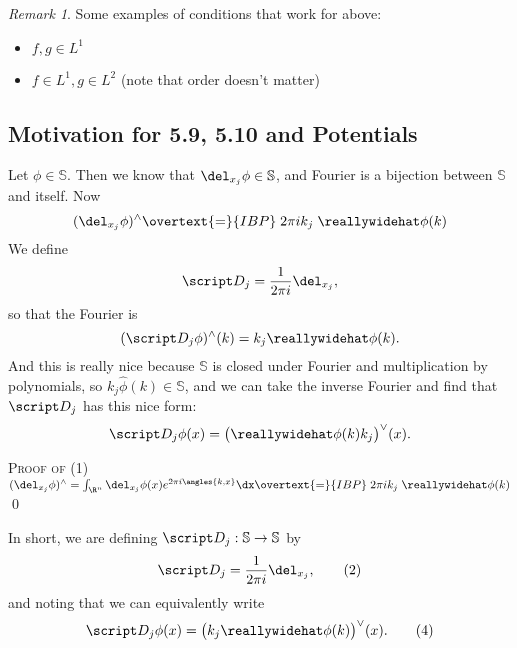 \documentclass[a5paper]{article}
\theoremstyle{definition}%
\numberwithin{exercise}{section}
\theoremstyle{remark}%
\newtheorem*{remark*}{Remark}
\renewcommand{\S}{\mathbb{S}}
\begin{document}
\pagebreak
\begin{remark*}
Some examples of conditions that work for above:
	\begin{itemize}
	\item $f,g\in L^1$
	\item $f\in L^1, g\in L^2$ (note that order doesn't matter)
	\end{itemize}
\end{remark*}


\subsection*{Motivation for 5.9, 5.10 and Potentials}

Let $\phi\in\S$. Then we know that $\del_{x_j}\phi\in\S$, and Fourier is a bijection between $\S$ and itself. Now 
\setcounter{equation}{0}
\begin{equation}
(\del_{x_j}\phi)^\wedge \overtext{=}{IBP} \;2\pi i k_j \;\hat{\phi}(k)
\end{equation}
We define 
\begin{equation}
\D_j = \frac{1}{2\pi i} \del_{x_j},
\end{equation}
so that the Fourier is 
\begin{equation}
(\D_j\phi)^\wedge (k) = k_j \hat{\phi}(k).
\end{equation}
And this is really nice because $\S$ is closed under Fourier and multiplication by polynomials, so $k_j \hat{\phi}(k)\in\S$, and we can take the inverse Fourier and find that $\D_j$ has this nice form:
\begin{equation}
\D_j\phi (x) = \big(\hat{\phi}(k) k_j\big)^\vee (x).
\end{equation}



\textsc{Proof of (1)}
\quad $(\del_{x_j}\phi)^\wedge = \int_{\Rn} \del_{x_j}\phi(x) e^{2\pi i \angles{k,x}}\dx  
\overtext{=}{IBP} \;2\pi i k_j \;\hat{\phi}(k) $
\qed

\begin{highlight}
In short, we are defining $\D_j:\S\to\S$ by 
\begin{equation}
\D_j = \frac{1}{2\pi i} \del_{x_j},\tag{$2$}
\end{equation}
and noting that we can equivalently write 
\begin{equation}
\D_j\phi (x) = \big(k_j\hat{\phi}(k) \big)^\vee (x).\tag{$4$}
\end{equation}
\end{highlight}
\end{document}
